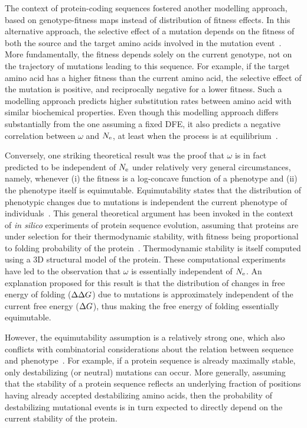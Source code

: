 The context of protein-coding sequences fostered another modelling approach, based on genotype-fitness maps instead of distribution of fitness effects.
In this alternative approach, the selective effect of a mutation depends on the fitness of both the source and the target amino acids involved in the mutation event~\citep{Halpern1998, Rodrigue2010, Tamuri2012}.
More fundamentally, the fitness depends solely on the current genotype, not on the trajectory of mutations leading to this sequence.
For example, if the target amino acid has a higher fitness than the current amino acid, the selective effect of the mutation is positive, and reciprocally negative for a lower fitness.
Such a modelling approach predicts higher substitution rates between amino acid with similar biochemical properties.
Even though this modelling approach differs substantially from the one assuming a fixed \acrshort{DFE}, it also predicts a negative correlation between $\omega$ and $N_{\text{e}}$, at least when the process is at equilibrium~\citep{Spielman2015, DosReis2015}.

Conversely, one striking theoretical result was the proof that $\omega$ is in fact predicted to be independent of $N_{\text{e}}$ under relatively very general circumstances, namely, whenever (i) the fitness is a log-concave function of a phenotype and (ii) the phenotype itself is equimutable.
Equimutability states that the distribution of phenotypic changes due to mutations is independent the current phenotype of individuals~\citep{Cherry1998}.
This general theoretical argument has been invoked in the context of \textit{in silico} experiments of protein sequence evolution, assuming that proteins are under selection for their thermodynamic stability, with fitness being proportional to folding probability of the protein~\citep{Goldstein2013}.
Thermodynamic stability is itself computed using a 3D structural model of the protein.
These computational experiments have led to the observation that $\omega$ is essentially independent of $N_{\text{e}}$.
An explanation proposed for this result is that the distribution of changes in free energy of folding ($\Delta \Delta G$) due to mutations is approximately independent of the current free energy ($\Delta G$), thus making the free energy of folding essentially equimutable.

However, the equimutability assumption is a relatively strong one, which also conflicts with combinatorial considerations about the relation between sequence and phenotype~\citep{Serohijos2012}.
For example, if a protein sequence is already maximally stable, only destabilizing (or neutral) mutations can occur.
More generally, assuming that the stability of a protein sequence reflects an underlying fraction of positions having already accepted destabilizing amino acids, then the probability of destabilizing mutational events is in turn expected to directly depend on the current stability of the protein.

